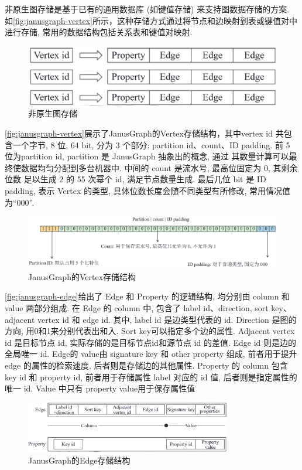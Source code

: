 \documentclass[12pt,hyperref,a4paper,UTF8]{ctexart}
\begin{document}
非原生图存储是基于已有的通用数据库 (如键值存储) 来支持图数据存储的方案. 如\autoref{fig:janusgraph-vertex}所示，这种存储方式通过将节点和边映射到表或键值对中进行存储, 常用的数据结构包括关系表和键值对映射.
\begin{figure}[H]
	\centering
	\includegraphics[width=\textwidth]{images/6.png}
	\caption{非原生图存储}
	\label{fig:non-native}
\end{figure}
\autoref{fig:janusgraph-vertex}展示了JanusGraph的Vertex存储结构，其中vertex id 共包含一个字节, 8 位, 64 bit, 分为  3 个部分: partition id、count、ID padding. 前 5 位为partition id, partition 是 JanusGraph 抽象出的概念, 通过  其数量计算可以最终使数据均匀分配到多台机器中.  中间的 count 是流水号, 最高位固定为 0, 其剩余位数  足以生成 2 的 55 次幂个 id, 满足节点数量生成. 最后几位 bit 是 ID padding, 表示 Vertex 的类型, 具体位数长度会随不同类型有所修改, 常用情况值为“000”.
\begin{figure}[H]
	\includegraphics[width=1\textwidth]{images/12.png}
	\caption{JanusGraph的Vertex存储结构}
	\label{fig:janusgraph-vertex}
\end{figure}
\autoref{fig:janusgraph-edge}给出了 Edge 和 Property 的逻辑结构, 均分别由 column 和 value 两部分组成. 在 Edge 的 column 中, 包含了 label id、direction, sort key、adjacent vertex id 和 edge id. 其中, label id 是边类型代表的 id. Direction 是图的方向, 用0和1来分别代表出和入. Sort key可以指定多个边的属性. Adjacent vertex id 是目标节点 id, 实际存储的是目标节点id和源节点 id 的差值. Edge id 则是边的全局唯一 id. Edge的 value由 signature key 和 other property 组成, 前者用于提升 edge 的属性的检索速度, 后者则是存储边的其他属性.  Property 的 column 包含 key id 和 property id, 前者用于存储属性 label 对应的 id 值, 后者则是指定属性的唯一 id. Value 中只有 property value用于保存属性值
\begin{figure}[H]
	\centering
	\includegraphics[width=0.8\textwidth]{images/13.png}
	\caption{JanusGraph的Edge存储结构}
	\label{fig:janusgraph-edge}
\end{figure}
\end{document}
